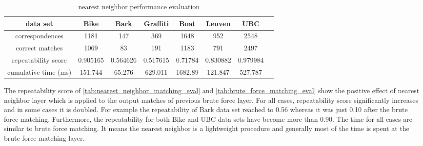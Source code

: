 \begin{table}[H]
  \begin{tabular}{| c || c | c | c | c | c | c | c |}
      \hline
      data set & Bike & Bark & Graffiti & Boat & Leuven & UBC \\ \hline \hline
      correspondences & 1181 & 147 & 369 & 1648 & 952 & 2548 \\ \hline
      correct matches & 1069 & 83 & 191 & 1183 & 791 & 2497 \\ \hline
      repeatability score & 0.905165 & 0.564626 & 0.517615 & 0.71784 & 0.830882 & 0.979984\\ \hline
      cumulative time (ms) & 151.744 & 65.276 & 629.011 & 1682.89 & 121.847 & 527.787 \\ \hline
  \end{tabular}
  \caption{nearest neighbor performance evaluation} \label{tab:nearest_neighbor_matching_eval}
\end{table}

The repeatability score of \autoref{tab:nearest_neighbor_matching_eval} and \autoref{tab:brute_force_matching_eval} show the positive effect of nearest neighbor layer which is applied to the output matches of previous brute force layer. For all cases, repeatability score significantly increases and in some cases it is doubled. For example the repeatability of Bark data set reached to 0.56 whereas it was just 0.10 after the brute force matching. Furthermore, the repeatability for both Bike and UBC data sets have become more than 0.90. The time for all cases are similar to brute force matching. It means the nearest neighbor is a lightweight procedure and generally most of the time is spent at the brute force matching layer.

